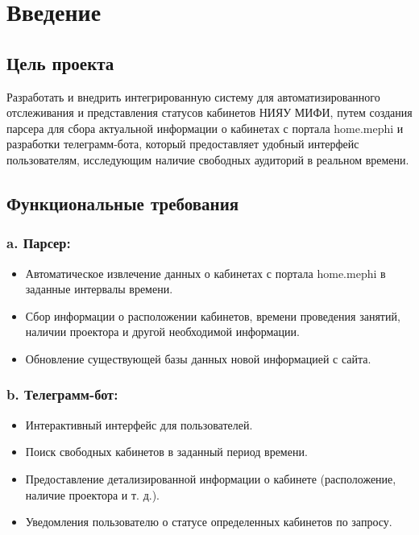 \chapter*{Введение}
\label{sec:afterwords}

\section*{Цель проекта}

Разработать и внедрить интегрированную систему для автоматизированного
отслеживания и представления статусов кабинетов НИЯУ МИФИ, путем создания
парсера для сбора актуальной информации о кабинетах с портала home.mephi и
разработки телеграмм-бота, который предоставляет удобный интерфейс
пользователям, исследующим наличие свободных аудиторий в реальном времени.

\section*{Функциональные требования}

\subsection*{a. Парсер:}
\begin{itemize}
    \item Автоматическое извлечение данных о кабинетах с портала home.mephi в
заданные интервалы времени.
    \item Сбор информации о расположении кабинетов, времени проведения занятий,
наличии проектора и другой необходимой информации.
    \item Обновление существующей базы данных новой информацией с сайта.
\end{itemize}

\subsection*{b. Телеграмм-бот:}
\begin{itemize}
    \item Интерактивный интерфейс для пользователей.
    \item Поиск свободных кабинетов в заданный период времени.
    \item Предоставление детализированной информации о кабинете (расположение,
наличие проектора и т. д.).
    \item Уведомления пользователю о статусе определенных кабинетов по запросу.
\end{itemize}

